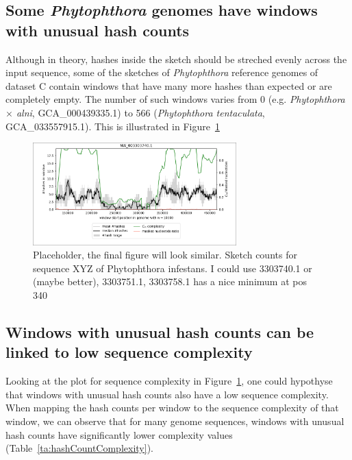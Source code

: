 \subsection*{Some \textit{Phytophthora} genomes have windows with unusual hash
counts} 

Although in theory, hashes inside the sketch should be streched evenly across
the input sequence, some of the sketches of \textit{Phytophthora} reference
genomes of dataset C contain windows that have many more hashes than expected or
are completely empty. The number of such windows varies from 0 (e.g.
\textit{Phytophthora $\times$  alni}, GCA\_000439335.1) to 566
(\textit{Phytophthora tentaculata}, GCA\_033557915.1). This is illustrated in
Figure~\ref{fig:sketchCountsOverview} 

\begin{figure}
  \centering
  \includegraphics[width=0.7\textwidth]{figures/placeholder_density.png}
  \caption{Placeholder, the final figure will look similar. Sketch counts for
   sequence XYZ of Phytophthora infestans. I could use 3303740.1 or (maybe
   better), 3303751.1, 3303758.1 has a nice minimum at pos 340}
  \label{fig:sketchCountsOverview}
\end{figure}

\subsection*{Windows with unusual hash counts can be linked to low sequence complexity}
Looking at the plot for sequence complexity in
Figure~\ref{fig:sketchCountsOverview}, one could hypothyse that windows with
unusual hash counts also have a low sequence complexity. When mapping the hash
counts per window to the sequence complexity of that window, we can observe that
for many genome sequences, windows with unusual hash counts have significantly
lower complexity values (Table~\ref{ta:hashCountComplexity}).

